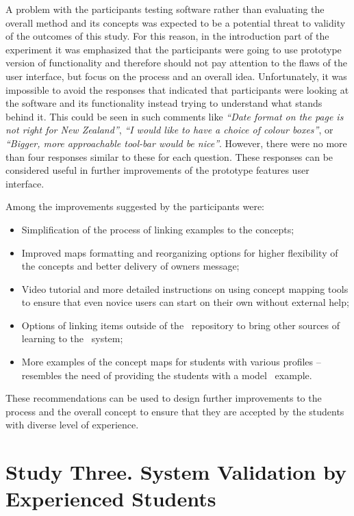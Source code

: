 A problem with the participants testing software rather than evaluating the
overall method and its concepts was expected to be a potential threat to
validity of the outcomes of this study. For this reason, in the introduction
part of the experiment it was emphasized that the participants were going to use
prototype version of functionality and therefore should not pay attention to
the flaws of the user interface, but focus on the process and an overall idea.
Unfortunately, it was impossible to avoid the responses that indicated that
participants were looking at the software and its functionality instead trying
to understand what stands behind it. This could be seen in such comments like
\textit{``Date format on the page is not right for New Zealand''}, \textit{``I
would like to have a choice of colour boxes''}, or \textit{``Bigger, more
approachable tool-bar would be nice''}. However, there were no more than four
responses similar to these for each question. These responses can be considered
useful in further improvements of the prototype features user interface.

Among the improvements suggested by the participants were:

\begin{itemize}
  \item Simplification of the process of linking examples to the concepts;
  \item Improved maps formatting and reorganizing options for higher
  flexibility of the concepts and better delivery of owners message;
  \item Video tutorial and more detailed instructions on using concept mapping
  tools to ensure that even novice users can start on their own without external
  help;
  \item Options of linking items outside of the \ep~repository to bring other
  sources of learning to the \ep~system;
  \item More examples of the concept maps for students with various profiles --
  resembles the need of providing the students with a model \ep~example.
\end{itemize}

These recommendations can be used to design further improvements to the process
and the overall concept to ensure that they are accepted by the students with
diverse level of experience.
 
\section{Study Three. System Validation by Experienced Students}
\label{sec:three}

